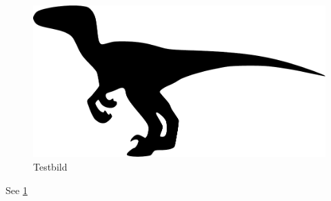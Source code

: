 \documentclass{scrartcl}
\begin{document}
\begin{figure}
\centering
\includegraphics{raptor}
\caption{Testbild}
\label{fig:testbild}
\end{figure}

See \cref{fig:testbild}
\end{document}
